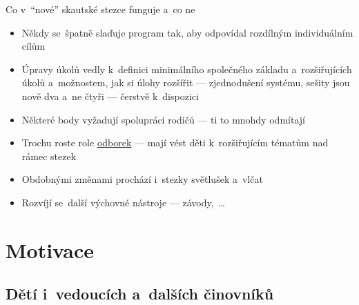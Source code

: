 \documentclass[compress, ucs, xelatex, 11pt, xcolor=dvipsnames, print, aspectratio=169,
	hyperref={
		bookmarks=true,
		unicode=true,
		colorlinks=true,
		pdftitle={Skautska vychovna metoda},
		plainpages=false,
		pdfauthor={Vojtech Zeisek},
		pdfsubject={Skautska vychovna metoda a jeji vyvoj za posledni stoleti a desetileti},
		pdfcreator={XeLaTeX},
		pdfkeywords={Junak, Pedagogika, Skaut, Skauting, Vychovna metoda},
		linkcolor=Red, %
		anchorcolor=ForestGreen, %
		citecolor=ForestGreen, %
		filecolor=ForestGreen, %
		menucolor=ForestGreen, %
		urlcolor=Sepia, %
		pdftex},
	url={hyphens, lowtilde} %
	]{beamer}
\begin{document}
\begin{frame}{Co v~\enquote{nové} skautské stezce funguje a~co ne}
	\begin{itemize}
		\item Někdy se~špatně slaďuje program tak, aby odpovídal rozdílným individuálním cílům
		\item Úpravy úkolů vedly k~definici minimálního společného základu a~rozšiřujících úkolů a~možnostem, jak si úlohy rozšířit --- zjednodušení systému, sešity jsou nově dva a~ne čtyři --- čerstvě k~dispozici
		\item Některé body vyžadují spolupráci rodičů --- ti to mnohdy odmítají
		\item Trochu roste role \href{https://odborky.skaut.cz/}{odborek} --- mají vést děti k~rozšiřujícím tématům nad rámec stezek
		\item Obdobnými změnami prochází i~stezky světlušek a~vlčat
		\item Rozvíjí se~další výchovné nástroje --- závody,~\ldots
	\end{itemize}
\end{frame}

\section{Motivace}

\subsection{Dětí i~vedoucích a~dalších činovníků}
\end{document}
